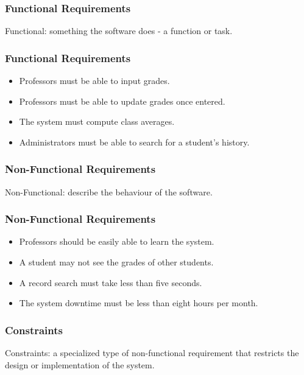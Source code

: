 \begin{frame}
\frametitle{Functional Requirements}
	Functional: something the software does - a function or task.
\end{frame}

\begin{frame}
\frametitle{Functional Requirements}

\begin{changemargin}{1cm}

\begin{itemize}
	\item Professors must be able to input grades.
	\item Professors must be able to update grades once entered.
	\item The system must compute class averages.
	\item Administrators must be able to search for a student's history.
\end{itemize}

\end{changemargin}
\end{frame}

\begin{frame}
\frametitle{Non-Functional Requirements}
	Non-Functional: describe the behaviour of the software.
\end{frame}

\begin{frame}
\frametitle{Non-Functional Requirements}

\begin{changemargin}{1cm}

\begin{itemize}
	\item Professors should be easily able to learn the system.
	\item A student may not see the grades of other students.
	\item A record search must take less than five seconds.
	\item The system downtime must be less than eight hours per month.
\end{itemize}

\end{changemargin}
\end{frame}


\begin{frame}
\frametitle{Constraints}
	Constraints: a specialized type of non-functional requirement that restricts the design or implementation of the system.
\end{frame}

